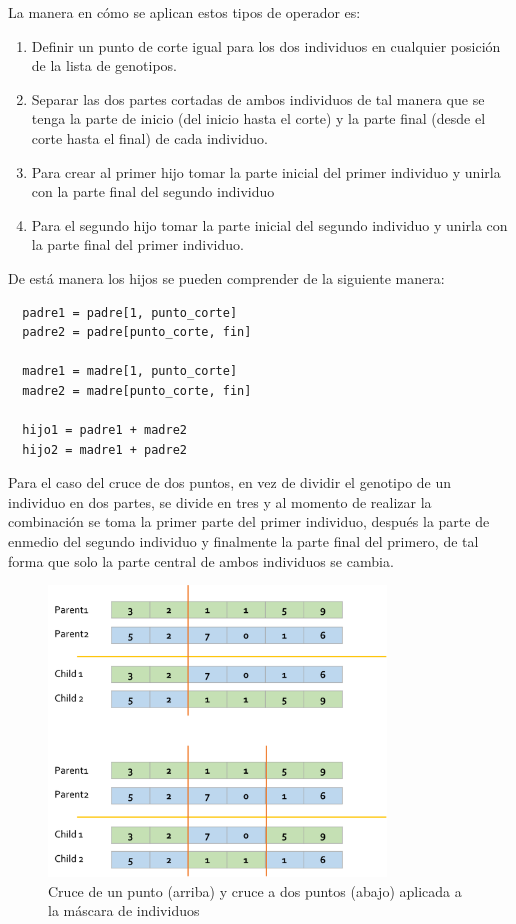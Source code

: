 La manera en cómo se aplican estos tipos de operador es:
\begin{enumerate}
  \item Definir un punto de corte igual para los dos individuos en cualquier
  posición de la lista de genotipos.
  \item Separar las dos partes cortadas de ambos individuos de tal manera que se
  tenga la parte de inicio (del inicio hasta el corte) y la parte final (desde
  el corte hasta el final) de cada individuo.
  \item Para crear al primer hijo tomar la parte inicial del primer individuo y
  unirla con la parte final del segundo individuo
  \item Para el segundo hijo tomar la parte inicial del segundo individuo y
  unirla con la parte final del primer individuo.
\end{enumerate}
De está manera los hijos se pueden comprender de la siguiente manera:
\begin{verbatim}
  padre1 = padre[1, punto_corte]
  padre2 = padre[punto_corte, fin]

  madre1 = madre[1, punto_corte]
  madre2 = madre[punto_corte, fin]

  hijo1 = padre1 + madre2
  hijo2 = madre1 + padre2
\end{verbatim}

Para el caso del cruce de dos puntos, en vez
de dividir el genotipo de un individuo en dos partes, se divide en tres y al
momento de realizar la combinación se toma la primer parte del primer individuo,
después la parte de enmedio del segundo individuo y finalmente la parte final
del primero, de tal forma que solo la parte central de ambos individuos se
cambia.

\begin{figure}
  \centering
  \includegraphics[width=0.8\textwidth]{img/crossover.png}
  \caption{Cruce de un punto (arriba) y cruce a dos puntos (abajo) aplicada a la máscara de individuos}
  \label{figure:crossover}
\end{figure}

